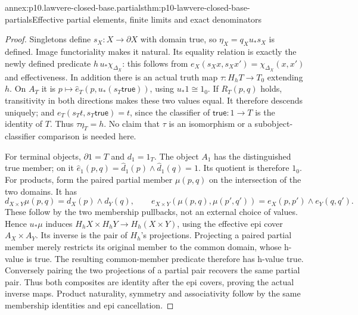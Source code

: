 \begin{annexitem}{annex:p10.lawvere-closed-base.partials}{thm:p10-lawvere-closed-base-partials}{Effective partial elements, finite limits and exact denominators}
\begin{proof}
Singletons define \(s_X:X\to\partial X\) with domain true,
so \(\eta_X=q_Xu_*s_X\) is defined. Image functoriality makes
it natural. Its equality relation is exactly the newly defined
predicate \(h\,u_*\chi_{\Delta_X}\): this follows from
\(e_X(s_Xx,s_Xx')=\chi_{\Delta_X}(x,x')\) and effectiveness.
In addition there is an actual truth map \(\tau:H_hT\to T_0\)
extending \(h\). On \(A_T\) it is
\(p\mapsto\widehat e_T(p,u_*(s_T\mathsf{true}))\),
using \(u_*1\cong1_0\).
If \(R_T(p,q)\) holds, transitivity in both directions makes
these two values equal. It therefore descends uniquely; and
\(e_T(s_Tt,s_T\mathsf{true})=t\), since the classifier of
\(\mathsf{true}:1\to T\) is the identity of \(T\).
Thus \(\tau\eta_T=h\). No claim that \(\tau\) is an
isomorphism or a subobject-classifier comparison is needed here.

For terminal objects, \(\partial1=T\) and \(d_1=1_T\).
The object \(A_1\) has the distinguished true member; on it
\(\widehat e_1(p,q)=\widehat d_1(p)\wedge\widehat d_1(q)=1\).
Its quotient is therefore \(1_0\). For products, form the paired
partial member \(\mu(p,q)\) on the intersection of the two
domains. It has
\[
 d_{X\times Y}\mu(p,q)=d_X(p)\wedge d_Y(q),\qquad
 e_{X\times Y}(\mu(p,q),\mu(p',q'))
                         =e_X(p,p')\wedge e_Y(q,q').       \tag{2}
\]
These follow by the two membership pullbacks, not an external choice
of values. Hence \(u_*\mu\) induces
\(H_hX\times H_hY\to H_h(X\times Y)\), using the effective
epi cover \(A_X\times A_Y\). Its inverse is the pair of
\(H_h\)'s projections. Projecting a paired partial member merely
restricts its original member to the common domain, whose h-value
is true. The resulting common-member predicate therefore has h-value
true. Conversely pairing the two projections of a partial pair
recovers the same partial pair. Thus both composites are identity
after the epi covers, proving the actual inverse maps. Product
naturality, symmetry and associativity follow by the same membership
identities and epi cancellation.


\end{proof}
\end{annexitem}
